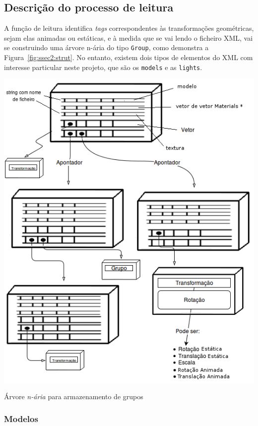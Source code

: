 \subsection{Descrição do processo de leitura}


A função de leitura identifica \emph{tags} correspondentes às transformações
geométricas, sejam elas animadas ou estáticas, e à medida que se vai lendo
o ficheiro XML, vai se construindo uma árvore n-ária do tipo \texttt{Group},
como demonstra a Figura~\ref{fig:ssec2:strut}. No entanto, existem dois tipos de
elementos do XML com interesse particular neste projeto, que são os
\texttt{models} e as \texttt{lights}.  

\begin{center} 	
\includegraphics[width=\textwidth,height=\textheight,keepaspectratio]{resources/estrutura.png}
\captionsetup{type=figure, width=0.8\linewidth}
\caption{Árvore \emph{n-ária} para armazenamento de grupos}
\label{fig:ssec2:strut} 
\end{center}

\subsubsection{Modelos}


